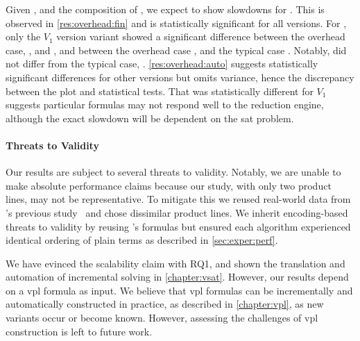 %
 Given ,
and the composition of \fin{}, we expect \vsat{} to show slowdowns for \fin{}.
This is observed in \autoref{res:overhead:fin} and is statistically significant
for all versions. For \auto{}, only the $V_{1}$ version variant showed a
significant difference between the overhead case, \pTov{}, and \vTov{}, and
between the overhead case \pTov{}, and the typical case \vTop{}. Notably,
\vTov{} did not differ from the typical case, \vTop{}.
\autoref{res:overhead:auto} suggests statistically significant differences for
other versions but omits variance, hence the discrepancy between the plot and
statistical tests. That \pTov{} was statistically different for $V_{1}$ suggests
particular formulas may not respond well to the reduction engine, although the
exact slowdown will be dependent on the \ac{sat} problem.

\paragraph{Threats to Validity}
Our results are subject to several threats to validity. Notably, we are unable
to make absolute performance claims because our study, with only two product
lines, may not be representative. To mitigate this we reused real-world data
from \nieke{}'s previous study~\citep{NMS+:GPCE18} and chose dissimilar product
lines. We inherit encoding-based threats to validity by reusing \nieke{}'s
formulas but ensured each algorithm experienced identical ordering of plain
terms as described in \autoref{sec:exper:perf}. 

We have evinced the scalability claim with RQ1, and shown the translation and
automation of incremental solving in \autoref{chapter:vsat}. However, our
results depend on a \ac{vpl} formula as input. We believe that \ac{vpl} formulas
can be incrementally and automatically constructed in practice, as described in
\autoref{chapter:vpl}, as new variants occur or become known. However, assessing
the challenges of \ac{vpl} construction is left to future work.

